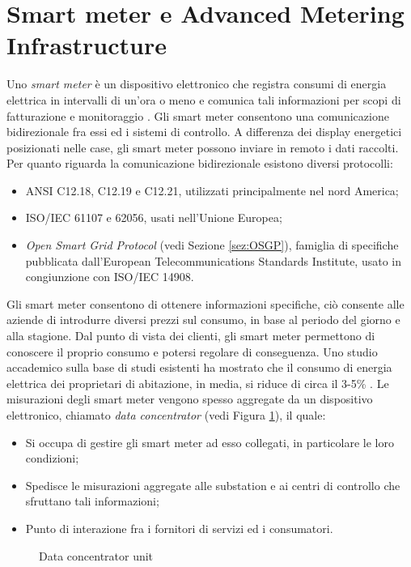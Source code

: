 \section{Smart meter e Advanced Metering Infrastructure}
Uno \emph{smart meter} è un dispositivo elettronico che registra consumi di energia elettrica in intervalli di un'ora o meno e comunica tali informazioni per scopi di fatturazione e monitoraggio \cite{smartmet}. Gli smart meter consentono una comunicazione bidirezionale fra essi ed i sistemi di controllo. A differenza dei display energetici posizionati nelle case, gli smart meter possono inviare in remoto i dati raccolti. 
\\
Per quanto riguarda la comunicazione bidirezionale esistono diversi protocolli:
\begin{itemize}
	\item ANSI C12.18, C12.19 e C12.21, utilizzati principalmente nel nord America;
	\item ISO/IEC 61107 e 62056, usati nell'Unione Europea;
	\item  \emph{Open Smart Grid Protocol} (vedi Sezione \ref{sez:OSGP}), famiglia di specifiche pubblicata dall'European Telecommunications Standards Institute, usato in congiunzione con ISO/IEC 14908.
\end{itemize}
Gli smart meter consentono di ottenere informazioni specifiche, ciò consente alle aziende di introdurre diversi prezzi sul consumo, in base al periodo del giorno e alla stagione. Dal punto di vista dei clienti, gli smart meter permettono di conoscere il proprio consumo e potersi regolare di conseguenza. Uno studio accademico sulla base di studi esistenti ha mostrato che il consumo di energia elettrica dei proprietari di abitazione, in media, si riduce di circa il 3-5\% \cite{energycons}.
Le misurazioni degli smart meter vengono spesso aggregate da un dispositivo elettronico, chiamato \emph{data concentrator} (vedi Figura \ref{fig:2_13}), il quale:
\begin{itemize}
	\item Si occupa di gestire gli smart meter ad esso collegati, in particolare le loro condizioni;
	\item Spedisce le misurazioni aggregate alle substation e ai centri di controllo che sfruttano tali informazioni;
	\item Punto di interazione fra i fornitori di servizi ed i consumatori.
\end{itemize}
\begin{figure}[h] 
\caption{Data concentrator unit}\label{fig:2_13}
\end{figure}

